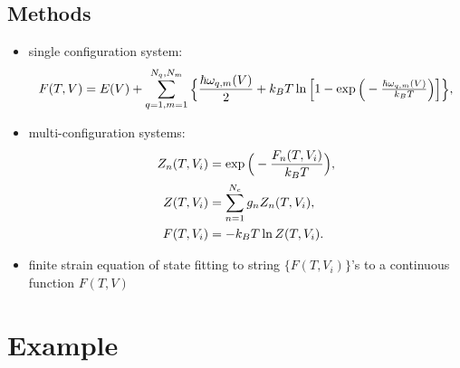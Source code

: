 \documentclass[13pt,aspectratio=169]{beamer}
\begin{document}
\subsection{Methods}
\begin{frame}{\subsecname}
	\begin{itemize}
		\item single configuration system: \begin{equation}\footnotesize
			      F(T, V) = E(V) + \sum_{q=1, m=1}^{N_q, N_m} \bigg\{\frac{ \hbar \omega_{q, m} (V) }{ 2 } + k_B T \ln \bigg[1 - \exp \Big( -\tfrac{\hbar \omega_{q,m} (V)}{k_B T} \Big)
				      \bigg]\bigg\},
		      \end{equation}
		\item multi-configuration systems: \begin{align}\footnotesize
			      Z_n (T, V_i) & = \exp \Big( -\frac{ F_n (T, V_i) }{ k_B T } \Big), \\
			      Z(T, V_i)    & = \sum_{n=1}^{N_c} g_n Z_n (T, V_i),                \\
			      F(T, V_i)    & = -k_B T \ln Z(T, V_i).
		      \end{align}
		\item finite strain equation of state fitting to string $\{F(T, V_i)\}$’s to a continuous function $F(T, V)$
	\end{itemize}
\end{frame}

\section{Example}
\end{document}
